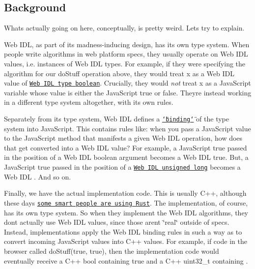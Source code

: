 \subsection*{Background}

What\textquotesingle{}s actually going on here, conceptually, is pretty weird. Let\textquotesingle{}s try to explain.

Web I\+DL, as part of its madness-\/inducing design, has its own type system. When people write algorithms in web platform specs, they usually operate on Web I\+DL values, i.\+e. instances of Web I\+DL types. For example, if they were specifying the algorithm for our {\ttfamily do\+Stuff} operation above, they would treat {\ttfamily x} as a Web I\+DL value of \href{http://heycam.github.io/webidl/#idl-boolean}{\tt Web I\+DL type {\ttfamily boolean}}. Crucially, they would {\itshape not} treat {\ttfamily x} as a Java\+Script variable whose value is either the Java\+Script {\ttfamily true} or {\ttfamily false}. They\textquotesingle{}re instead working in a different type system altogether, with its own rules.

Separately from its type system, Web I\+DL defines a \href{http://heycam.github.io/webidl/#ecmascript-binding}{\tt \char`\"{}binding\char`\"{}} of the type system into Java\+Script. This contains rules like\+: when you pass a Java\+Script value to the Java\+Script method that manifests a given Web I\+DL operation, how does that get converted into a Web I\+DL value? For example, a Java\+Script {\ttfamily true} passed in the position of a Web I\+DL {\ttfamily boolean} argument becomes a Web I\+DL {\ttfamily true}. But, a Java\+Script {\ttfamily true} passed in the position of a \href{http://heycam.github.io/webidl/#idl-unsigned-long}{\tt Web I\+DL {\ttfamily unsigned long}} becomes a Web I\+DL {}. And so on.

Finally, we have the actual implementation code. This is usually C++, although these days \href{https://github.com/servo/servo}{\tt some smart people are using Rust}. The implementation, of course, has its own type system. So when they implement the Web I\+DL algorithms, they don\textquotesingle{}t actually use Web I\+DL values, since those aren\textquotesingle{}t \char`\"{}real\char`\"{} outside of specs. Instead, implementations apply the Web I\+DL binding rules in such a way as to convert incoming Java\+Script values into C++ values. For example, if code in the browser called {\ttfamily do\+Stuff(true, true)}, then the implementation code would eventually receive a C++ {\ttfamily bool} containing {\ttfamily true} and a C++ {\ttfamily uint32\+\_\+t} containing {}.

